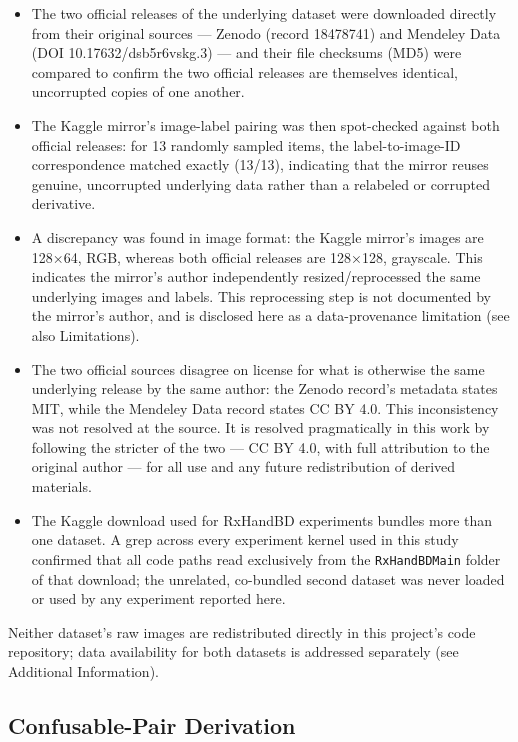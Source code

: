 \documentclass[fleqn,10pt]{wlpeerj}
\providecommand{\tightlist}{\setlength{\itemsep}{0pt}\setlength{\parskip}{0pt}}
\begin{document}
\begin{itemize}
\tightlist
\item
  The two official releases of the underlying dataset were downloaded directly from their original sources --- Zenodo (record 18478741) and Mendeley Data (DOI 10.17632/dsb5r6vskg.3) --- and their file checksums (MD5) were compared to confirm the two official releases are themselves identical, uncorrupted copies of one another.
\item
  The Kaggle mirror's image-label pairing was then spot-checked against both official releases: for 13 randomly sampled items, the label-to-image-ID correspondence matched exactly (13/13), indicating that the mirror reuses genuine, uncorrupted underlying data rather than a relabeled or corrupted derivative.
\item
  A discrepancy was found in image format: the Kaggle mirror's images are 128×64, RGB, whereas both official releases are 128×128, grayscale. This indicates the mirror's author independently resized/reprocessed the same underlying images and labels. This reprocessing step is not documented by the mirror's author, and is disclosed here as a data-provenance limitation (see also Limitations).
\item
  The two official sources disagree on license for what is otherwise the same underlying release by the same author: the Zenodo record's metadata states MIT, while the Mendeley Data record states CC BY 4.0. This inconsistency was not resolved at the source. It is resolved pragmatically in this work by following the stricter of the two --- CC BY 4.0, with full attribution to the original author --- for all use and any future redistribution of derived materials.
\item
  The Kaggle download used for RxHandBD experiments bundles more than one dataset. A grep across every experiment kernel used in this study confirmed that all code paths read exclusively from the \texttt{RxHandBDMain} folder of that download; the unrelated, co-bundled second dataset was never loaded or used by any experiment reported here.
\end{itemize}

Neither dataset's raw images are redistributed directly in this project's code repository; data availability for both datasets is addressed separately (see Additional Information).

\subsection*{Confusable-Pair Derivation}\label{sec:confusable-pair-derivation}
\end{document}
